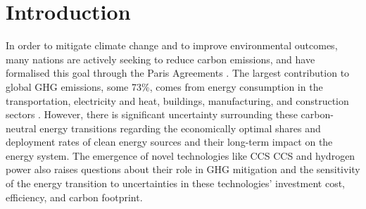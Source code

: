 \section{Introduction} \label{Introduction}
In order to mitigate climate change and to improve environmental outcomes, many nations are actively seeking to reduce carbon emissions, and have formalised this goal through the Paris Agreements \cite{united_nations_framework_convention_on_climate_change_unfccc_submission_2015}. The largest contribution to global \gls{GHG} emissions, some 73\%, comes from energy consumption in the transportation, electricity and heat, buildings, manufacturing, and construction sectors \cite{ge_4_2020}.  However, there is significant uncertainty surrounding these carbon-neutral energy transitions regarding the economically optimal shares and deployment rates of clean energy sources and their long-term impact on the energy system. The emergence of novel technologies like   \gls{CCS} \gls{CCS}\added{) }  and hydrogen power also raises questions about their role in \gls{GHG} mitigation and the sensitivity of the energy transition to uncertainties in these technologies' investment cost, efficiency, and carbon footprint.

